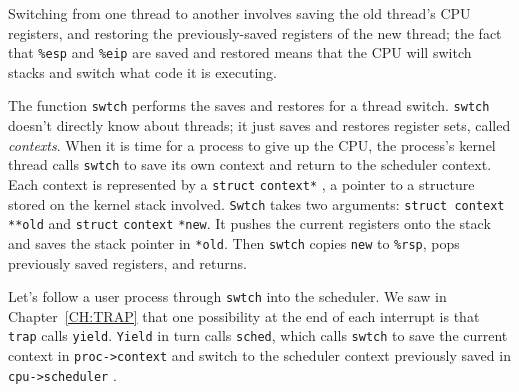 Switching from one thread to another involves saving the old thread's
CPU registers, and restoring the previously-saved registers of the
new thread; the fact that
\texttt{\%esp}
and
\texttt{\%eip}
are saved and restored means that the CPU will switch stacks and
switch what code it is executing.

The function
\lstinline{swtch}
performs the saves and restores for a thread switch.
\lstinline{swtch}
doesn't directly know about threads; it just saves and
restores register sets, called 
\textit{contexts}.
When it is time for a process to give up the CPU,
the process's kernel thread calls
\lstinline{swtch}
to save its own context and return to the scheduler context.
Each context is represented by a
\lstinline{struct}
\lstinline{context*}
,
a pointer to a structure stored on the kernel stack involved.
\lstinline{Swtch}
takes two arguments:
\lstinline{struct context}
\lstinline{**old}
and
\lstinline{struct}
\lstinline{context}
\lstinline{*new}.
It pushes the current registers onto the stack
and saves the stack pointer in
\lstinline{*old}.
Then
\lstinline{swtch}
copies
\lstinline{new}
to 
\texttt{\%rsp},
pops previously saved registers, and returns.

Let's follow a user process through
\lstinline{swtch} 
into the scheduler.
We saw in Chapter~\ref{CH:TRAP}
that one possibility at the end of each interrupt
is that 
\lstinline{trap}
calls 
\lstinline{yield}.
\lstinline{Yield}
in turn calls
\lstinline{sched},
which calls
\lstinline{swtch}
to save the current context in
\lstinline{proc->context}
and switch to the scheduler context previously saved in 
\lstinline{cpu->scheduler}
.

